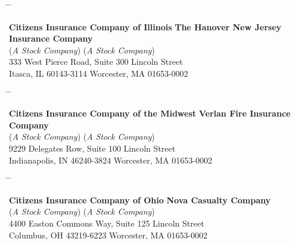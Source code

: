\documentclass[10pt]{article}
\begin{document}
\begin{tabbing}

    \hspace{1in} \= \hspace{3in} \= \kill

    \textbf{Citizens Insurance Company of Illinois} \> \> \textbf{The Hanover New Jersey Insurance Company} \\

    (\textit{A Stock Company}) \> \> (\textit{A Stock Company}) \\

    333 West Pierce Road, Suite 300 \>  Lincoln Street \\

    Itasca, IL 60143-3114 \> \> Worcester, MA 01653-0002 \\

\end{tabbing}

\begin{tabbing}

    \hspace{1in} \= \hspace{3in} \= \kill

    \textbf{Citizens Insurance Company of the Midwest} \> \> \textbf{Verlan Fire Insurance Company} \\

    (\textit{A Stock Company}) \> \> (\textit{A Stock Company}) \\

    9229 Delegates Row, Suite 100 \>  Lincoln Street \\

    Indianapolis, IN 46240-3824 \> \> Worcester, MA 01653-0002 \\

\end{tabbing}

\begin{tabbing}

    \hspace{1in} \= \hspace{3in} \= \kill

    \textbf{Citizens Insurance Company of Ohio} \> \> \textbf{Nova Casualty Company} \\

    (\textit{A Stock Company}) \> \> (\textit{A Stock Company}) \\

    4400 Easton Commons Way, Suite 125 \>  Lincoln Street \\

    Columbus, OH 43219-6223 \> \> Worcester, MA 01653-0002 \\

\end{tabbing}


\extramarks{}{}
\end{document}
